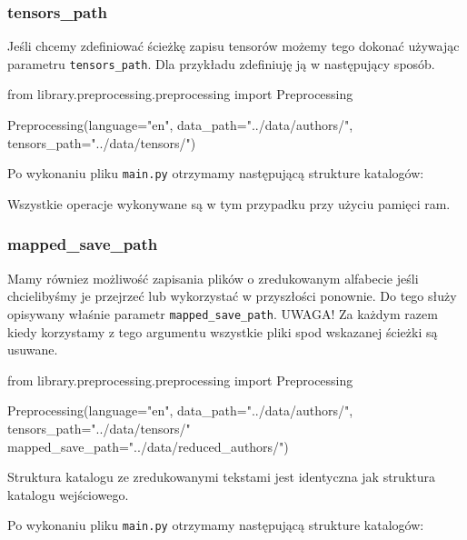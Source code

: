 \myspace
{}
\myspace

\newpage
\subsubsection{tensors\_path}
Jeśli chcemy zdefiniować ścieżkę zapisu tensorów możemy tego dokonać używając parametru 
\texttt{tensors\_path}. Dla przykładu zdefiniuję ją w następujący sposób. 
\begin{python}
from library.preprocessing.preprocessing import Preprocessing

Preprocessing(language="en",
              data_path="../data/authors/",
              tensors_path="../data/tensors/")
                   
\end{python}

Po wykonaniu pliku \texttt{main.py} otrzymamy następującą strukture katalogów:
\myspace
{}
\myspace

Wszystkie operacje wykonywane są w tym przypadku przy użyciu pamięci ram.


\subsubsection{mapped\_save\_path}
Mamy równiez możliwość zapisania plików o zredukowanym alfabecie jeśli chcielibyśmy je przejrzeć lub
wykorzystać w przyszłości ponownie. Do tego służy opisywany właśnie parametr \texttt{mapped\_save\_path}.
UWAGA! Za każdym razem kiedy korzystamy z tego argumentu wszystkie pliki spod wskazanej ścieżki są 
usuwane.

\begin{python}
from library.preprocessing.preprocessing import Preprocessing

Preprocessing(language="en",
              data_path="../data/authors/",
              tensors_path="../data/tensors/"
              mapped_save_path="../data/reduced_authors/")
                   
\end{python}
Struktura katalogu ze zredukowanymi tekstami jest identyczna jak struktura katalogu wejściowego. 

Po wykonaniu pliku \texttt{main.py} otrzymamy następującą strukture katalogów:

\myspace
{}
\myspace


